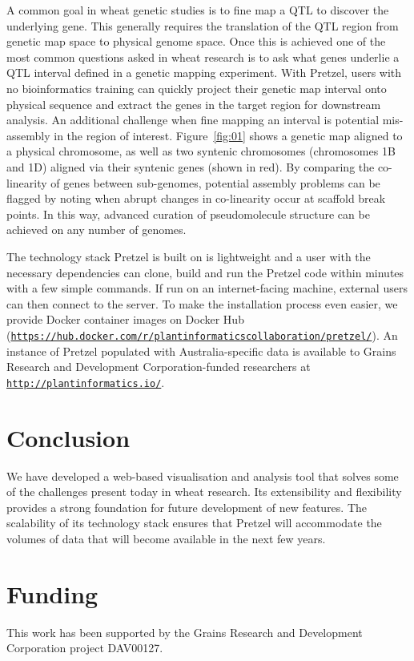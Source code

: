 A common goal in wheat genetic studies is to fine map a QTL to discover the underlying gene. This generally requires the translation of the
  QTL region from genetic map space to physical genome space. Once this is achieved one of the most common questions asked in wheat research 
  is to ask what genes underlie a QTL interval defined in a genetic mapping experiment. 
%
With Pretzel, users with no bioinformatics training can quickly project their genetic map interval
  onto physical sequence and extract the genes in the target region for downstream analysis. 
%
An additional challenge when fine mapping an interval is potential mis-assembly in the region
  of interest. Figure~\ref{fig:01} shows a genetic map aligned to a physical chromosome, as well as
  two syntenic chromosomes (chromosomes 1B and 1D) aligned via their syntenic genes (shown in red). 
%
By comparing the co-linearity of genes between sub-genomes, potential assembly problems can be
  flagged by noting when abrupt changes in co-linearity occur at scaffold break points. 
%
In this way, advanced curation of pseudomolecule structure can be achieved on any number of genomes.

The technology stack Pretzel is built on is lightweight and a user with the necessary dependencies
can clone, build and run the Pretzel code within minutes with a few simple commands. 
%
If run on an internet-facing machine, external users can then connect to the server.
%
To make the installation process even easier, we provide Docker container images on Docker Hub
(\href{https://hub.docker.com/r/plantinformaticscollaboration/pretzel/}{\nolinkurl{https://hub.docker.com/r/plantinformaticscollaboration/pretzel/}}).
An instance of Pretzel populated with Australia-specific data is available to Grains Research and
Development Corporation-funded researchers at \href{http://plantinformatics.io/}{\nolinkurl{http://plantinformatics.io/}}.

\section{Conclusion}

We have developed a web-based visualisation and analysis tool that solves some of the challenges
present today in wheat research. Its extensibility and flexibility provides a strong foundation for
future development of new features. The scalability of its technology stack ensures that Pretzel
will accommodate the volumes of data that will become available in the next few years.

\section*{Funding}

This work has been supported by the Grains Research and Development Corporation project DAV00127.\vspace*{-12pt}




